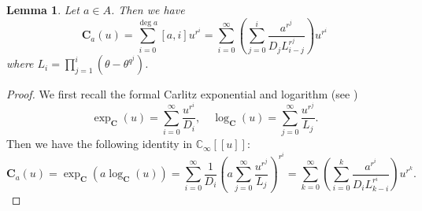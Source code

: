 \documentclass[12pt,reqno]{amsart}
\numberwithin{equation}{section}
\theoremstyle{plain}
\newtheorem{lem}[thm]{Lemma}
\theoremstyle{definition}
\theoremstyle{remark}
\newcommand{\CC}{\mathbb{C}}
\newcommand{\mbb}[1]{[\![{#1}]\!]}
\newcommand{\C}{\mathbf{C}}
\begin{document}
\begin{lem}\label{lem:Carlitz coefficient}Let $a\in A$. Then we have
$$\C_a(u)=\sum_{i=0}^{\deg a}[a,i]u^{r^i}=\sum_{i=0}^\infty \left(\sum_{j=0}^i \frac{a^{r^j}}{D_j L_{i-j}^{r^j}}\right)u^{r^i}$$
where $L_i=\prod_{j=1}^i(\theta-\theta^{q^j})$.
\end{lem}
\begin{proof}
We first recall the formal Carlitz exponential and logarithm (see \cite{Goss1996})
    $$\exp_\C(u) = \sum_{i=0}^{\infty} \frac{u^{r^i}}{D_i}, \quad \log_\C(u) = \sum_{j=0}^{\infty} \frac{u^{r^j}}{L_j}.$$
    Then we have the following identity in $\CC_\infty\mbb{u}$:
    $$\C_a(u)=\exp_\C(a\log_\C(u))= \sum_{i=0}^{\infty} \frac{1}{D_i} \left( a \sum_{j=0}^{\infty} \frac{u^{r^j}}{L_j} \right)^{r^i}=  \sum_{k=0}^{\infty} \left( \sum_{i=0}^k \frac{a^{r^i}}{D_i L_{k-i}^{r^i}} \right) u^{r^k}.$$
\end{proof}
\end{document}
